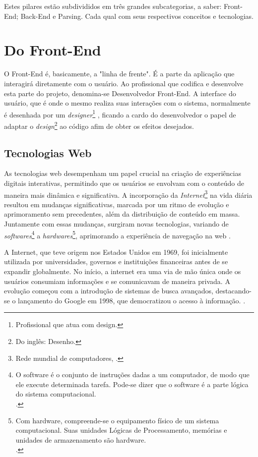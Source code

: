 Estes pilares estão subdivididos em três grandes subcategorias, a saber: Front-End;
Back-End e Parsing. Cada qual com seus respectivos conceitos e tecnologias.

\section{Do Front-End}

O Front-End é, basicamente, a "linha de frente". É a parte da aplicação que interagirá
diretamente com o usuário. Ao profissional que codifica e desenvolve esta parte do
projeto, denomina-se Desenvolvedor Front-End. A interface do usuário, que é
onde o mesmo realiza suas interações com o sistema, normalmente é desenhada por
um
\textit{designer}\footnote{Profissional que atua com design.
}
, ficando a cardo do desenvolvedor o papel de adaptar o
\textit{design}\footnote{Do inglês: Desenho.
}
ao código afim de obter os efeitos desejados.
\cite{totvs-front-end}

\subsection{Tecnologias Web}

As tecnologias
\acrshort{web}
desempenham um papel crucial na criação de experiências
digitais interativas, permitindo que os usuários se envolvam com o conteúdo de maneira mais
dinâmica e significativa. A incorporação da
\textit{Internet}\footnote{Rede mundial de computadores, \cite{marco-civil-art-2}.
}
na vida diária resultou em mudanças
significativas, marcada por um ritmo de evolução e aprimoramento sem precedentes, além da
distribuição de conteúdo em massa. Juntamente com essas mudanças, surgiram novas
tecnologias, variando de
\textit{softwares}\footnote{O software é o conjunto de instruções dadas a um computador, de modo que
    ele execute determinada tarefa. Pode-se dizer que o software é
    a parte lógica do sistema computacional.  \\  \cite{hardware-e-software}.
}
a
\textit{hardwares}\footnote{Com hardware, compreende-se o equipamento físico de um sistema computacional.
    Suas unidades Lógicas de Processamento, memórias e unidades de armazenamento são
    hardware.  \\  \cite{hardware-e-software}.
},
aprimorando a experiência de navegação na
\acrshort{web}
\cite{molgado}.

A Internet, que teve origem nos Estados Unidos em 1969, foi inicialmente utilizada
por universidades, governos e instituições financeiras antes de se expandir globalmente. No
início, a internet era uma via de mão única onde os usuários consumiam informações e se
comunicavam de maneira privada. A evolução começou com a introdução de sistemas de
busca avançados, destacando-se o lançamento do Google em 1998, que democratizou o
acesso à informação.
\cite{vitoriano}.

